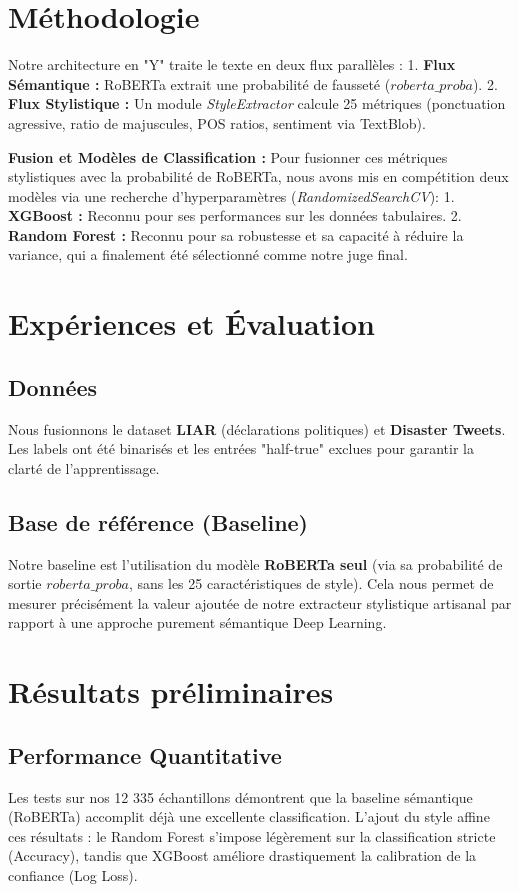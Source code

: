 \documentclass[11pt,twocolumn]{article}
\begin{document}
\section{Méthodologie}
Notre architecture en "Y" traite le texte en deux flux parallèles :
1. \textbf{Flux Sémantique :} RoBERTa extrait une probabilité de fausseté ($roberta\_proba$).
2. \textbf{Flux Stylistique :} Un module \textit{StyleExtractor} calcule 25 métriques (ponctuation agressive, ratio de majuscules, POS ratios, sentiment via TextBlob).

\textbf{Fusion et Modèles de Classification :} Pour fusionner ces métriques stylistiques avec la probabilité de RoBERTa, nous avons mis en compétition deux modèles via une recherche d'hyperparamètres (\textit{RandomizedSearchCV}):
1. \textbf{XGBoost :} Reconnu pour ses performances sur les données tabulaires.
2. \textbf{Random Forest :} Reconnu pour sa robustesse et sa capacité à réduire la variance, qui a finalement été sélectionné comme notre juge final.

\section{Expériences et Évaluation}
\subsection{Données}
Nous fusionnons le dataset \textbf{LIAR} (déclarations politiques) et \textbf{Disaster Tweets}. Les labels ont été binarisés et les entrées "half-true" exclues pour garantir la clarté de l'apprentissage.

\subsection{Base de référence (Baseline)}
Notre baseline est l'utilisation du modèle \textbf{RoBERTa seul} (via sa probabilité de sortie $roberta\_proba$, sans les 25 caractéristiques de style). Cela nous permet de mesurer précisément la valeur ajoutée de notre extracteur stylistique artisanal par rapport à une approche purement sémantique Deep Learning.

\section{Résultats préliminaires}
\subsection{Performance Quantitative}
Les tests sur nos 12 335 échantillons démontrent que la baseline sémantique (RoBERTa) accomplit déjà une excellente classification. L'ajout du style affine ces résultats : le Random Forest s'impose légèrement sur la classification stricte (Accuracy), tandis que XGBoost améliore drastiquement la calibration de la confiance (Log Loss).
\end{document}
